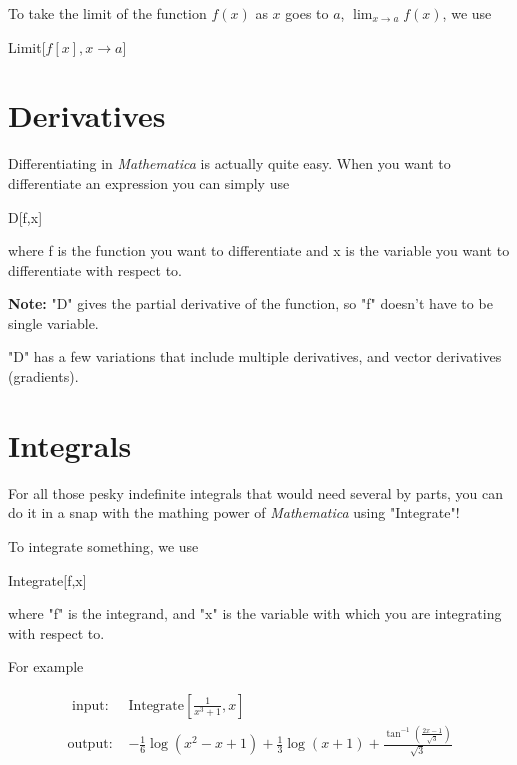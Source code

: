 \documentclass[11pt,letterpaper,twoside,titlepage]{report}
\newcommand{\Mathematica}{\textit{Mathematica} }
\begin{document}
				To take the limit of the function $f(x)$ as $x$ goes to $a$, $\displaystyle \lim_{x \rightarrow a} f(x)$, we use
				
				\begin{center}
					
					Limit[$f[x], x \rightarrow a$]
				
				\end{center}
						
			\section{Derivatives}
						
				Differentiating in \Mathematica is actually quite easy.  When you want to differentiate an expression you can simply use 
					
				\begin{center} D[f,x] \end{center}
					
				where f is the function you want to differentiate and x is the variable you want to differentiate with respect to.
					
				\textbf{Note:} "D" gives the partial derivative of the function, so "f" doesn't have to be single variable.
					
				"D" has a few variations that include multiple derivatives, and vector derivatives (gradients).
						
			\section{Integrals}
						
				For all those pesky indefinite integrals that would need several by parts, you can do it in a snap with the mathing power of \Mathematica using "Integrate"!
					
				To integrate something, we use
					
				\begin{center}
					
					Integrate[f,x]
					
				\end{center}
					
				where "f" is the integrand, and "x" is the variable with which you are integrating with respect to.
						
				For example
						
				\begin{align*}
					\text{ input: }& \text{Integrate} \left[ \frac{1}{x^3 + 1}, x \right] \\		
					\text{output: }& -\frac{1}{6} \log \left(x^2-x+1\right)+\frac{1}{3} \log (x+1)+\frac{\tan ^{-1}\left(\frac{2 x-1}{\sqrt{3}}\right)}{\sqrt{3}} \\
				\end{align*}
						
\end{document}
